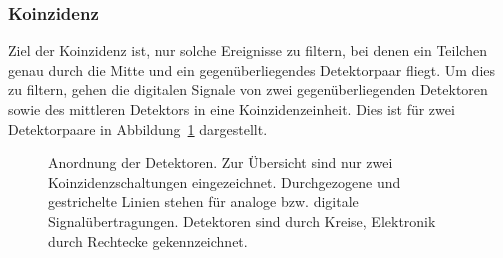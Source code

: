 \documentclass[11pt, ngerman, fleqn, DIV=15, headinclude, BCOR=2cm]{scrreprt}
\begin{document}
\subsubsection{Koinzidenz}

Ziel der Koinzidenz ist, nur solche Ereignisse zu filtern, bei denen ein
Teilchen genau durch die Mitte und ein gegenüberliegendes Detektorpaar
fliegt. Um dies zu filtern, gehen die digitalen Signale von zwei
gegenüberliegenden Detektoren sowie des mittleren Detektors in eine
Koinzidenzeinheit. Dies ist für zwei Detektorpaare in
Abbildung~\ref{fig:koinzidenz} dargestellt.

\begin{figure}[htbp]
    \centering
    \caption{%
        Anordnung der Detektoren. Zur Übersicht sind nur zwei
        Koinzidenzschaltungen eingezeichnet. Durchgezogene und gestrichelte
        Linien stehen für analoge bzw. digitale Signalübertragungen. Detektoren
        sind durch Kreise, Elektronik durch Rechtecke gekennzeichnet.
    }
    \label{fig:koinzidenz}
\end{figure}
\end{document}
